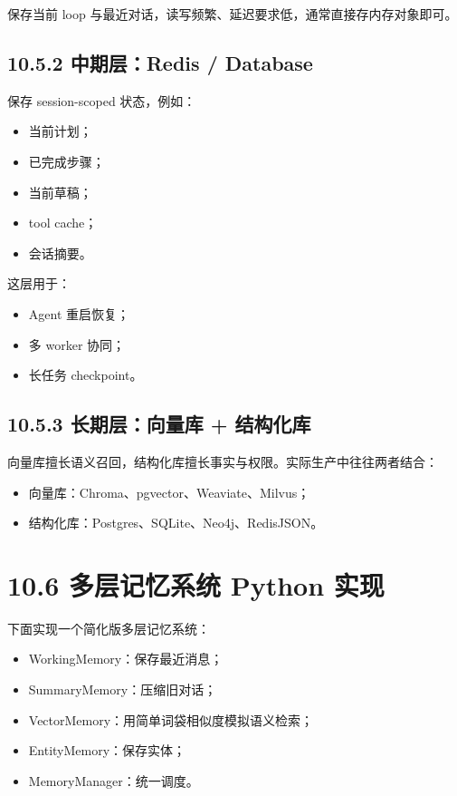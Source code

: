 保存当前 loop 与最近对话，读写频繁、延迟要求低，通常直接存内存对象即可。


\subsection{10.5.2 中期层：Redis / Database}

保存 session-scoped 状态，例如：


\begin{itemize}[leftmargin=2em]
\item 当前计划；
\item 已完成步骤；
\item 当前草稿；
\item tool cache；
\item 会话摘要。
\end{itemize}

这层用于：


\begin{itemize}[leftmargin=2em]
\item Agent 重启恢复；
\item 多 worker 协同；
\item 长任务 checkpoint。
\end{itemize}

\subsection{10.5.3 长期层：向量库 + 结构化库}

向量库擅长语义召回，结构化库擅长事实与权限。实际生产中往往两者结合：


\begin{itemize}[leftmargin=2em]
\item 向量库：Chroma、pgvector、Weaviate、Milvus；
\item 结构化库：Postgres、SQLite、Neo4j、RedisJSON。
\end{itemize}

\section{10.6 多层记忆系统 Python 实现}

下面实现一个简化版多层记忆系统：


\begin{itemize}[leftmargin=2em]
\item WorkingMemory：保存最近消息；
\item SummaryMemory：压缩旧对话；
\item VectorMemory：用简单词袋相似度模拟语义检索；
\item EntityMemory：保存实体；
\item MemoryManager：统一调度。
\end{itemize}

